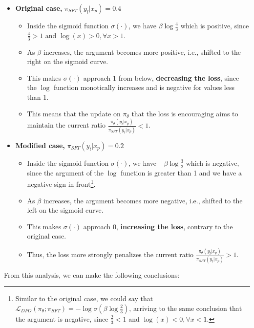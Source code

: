 \documentclass{article}
\begin{document}
\begin{itemize}
    \item \textbf{Original case,} \boldmath$\pi_{SFT}(y_l|x_p) = 0.4$\unboldmath
          \begin{itemize}
              \item Inside the sigmoid function $\sigma(\cdot)$, we have $\beta\log\frac{4}{3}$ which is positive, since $\frac{4}{3} > 1$ and $\log(x) > 0, \forall x > 1$.
              \item As $\beta$ increases, the argument becomes more positive, i.e., shifted to the right on the sigmoid curve.
              \item This makes $\sigma(\cdot)$ approach 1 from below, \textbf{decreasing the loss}, since the $\log$ function monotically increases and is negative for values less than 1.
              \item This means that the update on $\pi_\theta$ that the loss is encouraging aims to maintain the current ratio $\frac{\pi_\theta(y_l|x_p)}{\pi_{SFT}(y_l|x_p)} < 1$.
          \end{itemize}
    \item \textbf{Modified case,} \boldmath$\pi_{SFT}(y_l|x_p) = 0.2$\unboldmath
          \begin{itemize}
              \item Inside the sigmoid function $\sigma(\cdot)$, we have $-\beta\log\frac{3}{2}$ which is negative, since the argument of the $\log$ function is greater than 1 and we have a negative sign in front\footnote{Similar to the original case, we could say that $\mathcal{L}_{DPO}(\pi_\theta; \pi_{SFT}) = -\log \sigma\left(\beta\log\frac{2}{3}\right)$, arriving to the same conclusion that the argument is negative, since $\frac{2}{3} < 1$ and $\log(x) < 0, \forall x < 1$.}.
              \item As $\beta$ increases, the argument becomes more negative, i.e., shifted to the left on the sigmoid curve.
              \item This makes $\sigma(\cdot)$ approach 0, \textbf{increasing the loss}, contrary to the original case.
              \item Thus, the loss more strongly penalizes the current ratio $\frac{\pi_\theta(y_l|x_p)}{\pi_{SFT}(y_l|x_p)} > 1$.
          \end{itemize}
\end{itemize}

From this analysis, we can make the following conclusions:
\end{document}
